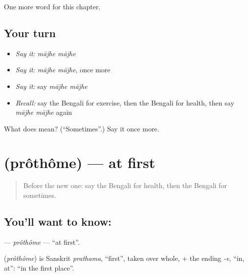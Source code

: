 \begin{grammarlens}[title={What you've built}]
One more word for this chapter.
\end{grammarlens}

\subsection*{Your turn}
\begin{itemize}
\raggedright
  \item \emph{Say it:} \emph{mājhe mājhe}
  \item \emph{Say it:} \emph{mājhe mājhe}, once more
  \item \emph{Say it:} say \emph{mājhe mājhe}
  \item \emph{Recall:} say the Bengali for exercise, then the Bengali for health, then say \emph{mājhe mājhe} again
\end{itemize}

\begin{tcolorbox}[breakable,colback=teal!4,colframe=teal!35!black,title={Before you move on}]
What does   mean? (\textquotedblleft{}Sometimes\textquotedblright{}.) Say it once more.
\end{tcolorbox}
\section[\texorpdfstring{\bn{প্রথমে} (prôthôme)}{প্রথমে (prôthôme)}]{ (prôthôme) — at first}

\label{lesson:BN-C156-prothome}



\begin{quote}
Before the new one: say the Bengali for health, then the Bengali for sometimes.
\end{quote}

\subsection*{You'll want to know: }
\textbf{} — \emph{prôthôme} — \textquotedblleft{}at first\textquotedblright{}.

\begin{cousinweb}
\textbf{} (\emph{prôthôme}) is Sanskrit \emph{prathama}, \textquotedblleft{}first\textquotedblright{}, taken over whole, + the ending \emph{-e}, \textquotedblleft{}in, at\textquotedblright{}: \textquotedblleft{}in the first place\textquotedblright{}.
\end{cousinweb}

